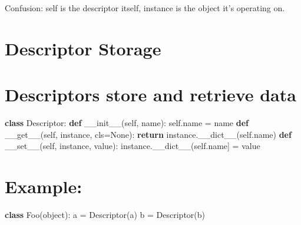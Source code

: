 \documentclass[
  letterpaper,
  DIV=11,
  numbers=noendperiod]{scrreprt}
\newenvironment{Shaded}{\begin{snugshade}}{\end{snugshade}}
\newcommand{\BuiltInTok}[1]{\textcolor[rgb]{0.00,0.23,0.31}{#1}}
\newcommand{\ControlFlowTok}[1]{\textcolor[rgb]{0.00,0.23,0.31}{\textbf{#1}}}
\newcommand{\FunctionTok}[1]{\textcolor[rgb]{0.28,0.35,0.67}{#1}}
\newcommand{\KeywordTok}[1]{\textcolor[rgb]{0.00,0.23,0.31}{\textbf{#1}}}
\newcommand{\NormalTok}[1]{\textcolor[rgb]{0.00,0.23,0.31}{#1}}
\newcommand{\OperatorTok}[1]{\textcolor[rgb]{0.37,0.37,0.37}{#1}}
\newcommand{\StringTok}[1]{\textcolor[rgb]{0.13,0.47,0.30}{#1}}
\newcommand{\VariableTok}[1]{\textcolor[rgb]{0.07,0.07,0.07}{#1}}
\begin{document}
Confusion: self is the descriptor itself, instance is the object it's
operating on.


\chapter{Descriptor Storage}\label{descriptor-storage}


\chapter{Descriptors store and retrieve
data}\label{descriptors-store-and-retrieve-data}

\begin{Shaded}
\begin{Highlighting}[]
\KeywordTok{class}\NormalTok{ Descriptor: }\KeywordTok{def} \FunctionTok{\_\_init\_\_}\NormalTok{(}\VariableTok{self}\NormalTok{, name): }\VariableTok{self}\NormalTok{.name }\OperatorTok{=}\NormalTok{ name }\KeywordTok{def} \FunctionTok{\_\_get\_\_}\NormalTok{(}\VariableTok{self}\NormalTok{, instance, cls}\OperatorTok{=}\VariableTok{None}\NormalTok{): }\ControlFlowTok{return}\NormalTok{ instance.\_\_dict\_\_(}\VariableTok{self}\NormalTok{.name) }\KeywordTok{def} \FunctionTok{\_\_set\_\_}\NormalTok{(}\VariableTok{self}\NormalTok{, instance, value): instance.\_\_dict\_\_(}\VariableTok{self}\NormalTok{.name] }\OperatorTok{=}\NormalTok{ value }
\end{Highlighting}
\end{Shaded}


\chapter{Example:}\label{example-2}

\begin{Shaded}
\begin{Highlighting}[]
\KeywordTok{class}\NormalTok{ Foo(}\BuiltInTok{object}\NormalTok{):}
\NormalTok{    a }\OperatorTok{=}\NormalTok{ Descriptor(}\StringTok{\textquotesingle{}a\textquotesingle{}}\NormalTok{)}
\NormalTok{    b }\OperatorTok{=}\NormalTok{ Descriptor(}\StringTok{\textquotesingle{}b\textquotesingle{}}\NormalTok{) }
\end{Highlighting}
\end{Shaded}
\end{document}
